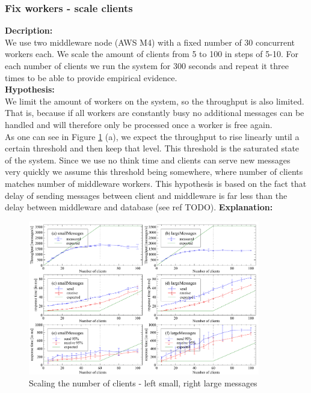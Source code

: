 \documentclass[11pt]{article}
\begin{document}
\subsubsection{Fix workers - scale clients}
\textbf{Decription:}\\
We use two middleware node (AWS M4) with a fixed number of 30 concurrent workers each. We scale the amount of clients from 5 to 100 in steps of 5-10. For each number of clients we run the system for 300 seconds and repeat it three times to be able to provide empirical evidence.\\
\textbf{Hypothesis:}\\
We limit the amount of workers on the system, so the throughput is also limited. That is, because if all workers are constantly busy no additional messages can be handled and will therefore only be processed once a worker is free again. \\
As one can see in Figure \ref{fig:maxclientperinstance} (a), we expect the throughput to rise linearly until a certain threshold and then keep that level. This threshold is the saturated state of the system. Since we use no think time and clients can serve new messages very quickly we assume this threshold being somewhere, where number of clients matches number of middleware workers. This hypothesis is based on the fact that delay of sending messages between client and middleware is far less than the delay between middleware and database (see ref TODO).
\textbf{Explanation:}\\

\begin{figure}[ht]
  \begin{center}
    \includegraphics[width=0.9\textwidth]{../results/maxclientperinstance.pdf}
    \caption{Scaling the number of clients - left small, right large messages}
    \label{fig:maxclientperinstance}
  \end{center}
\end{figure}
\end{document}
